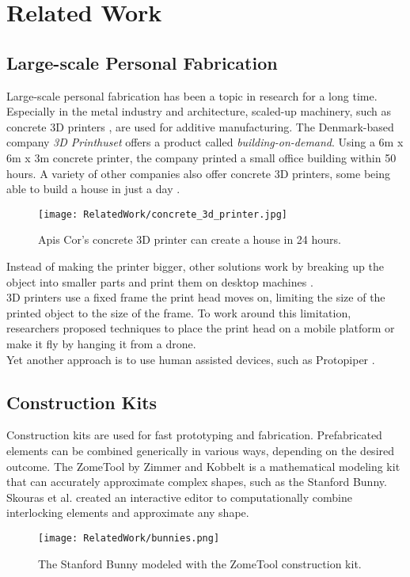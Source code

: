 \chapter{Related Work}\label{ch:relatedwork}
\section{Large-scale Personal Fabrication}
Large-scale personal fabrication has been a topic in research for a long time. Especially in the metal industry and architecture, scaled-up machinery, such as concrete 3D printers \cite{epstein:2003}, are used for additive manufacturing. The Denmark-based company \textit{3D Printhuset}\cite{printhuset} offers a product called \textit{building-on-demand}. Using a 6m x 6m x 3m concrete printer, the company printed a small office building within 50 hours. A variety of other companies also offer concrete 3D printers, some being able to build a house in just a day \cite{apiscor}.\\
\begin{figure}[h!]
    \texttt{[image: RelatedWork/concrete\_3d\_printer.jpg]}
    \centering
    \caption{Apis Cor’s concrete 3D printer can create a house in 24 hours.}
    \label{fig:concrete_3d_printer}
\end{figure}
Instead of making the printer bigger, other solutions work by breaking up the object into smaller parts and print them on desktop machines \cite{lau:2011, luo:2012}.\\
3D printers use a fixed frame the print head moves on, limiting the size of the printed object to the size of the frame. To work around this limitation, researchers proposed techniques to place the print head on a mobile platform \cite{jokic:2016} or make it fly \cite{willmann:2012} by hanging it from a drone.\\
Yet another approach is to use human assisted devices, such as Protopiper \cite{agrawal:2015}.

\section{Construction Kits}
Construction kits are used for fast prototyping and fabrication. Prefabricated elements can be combined generically in various ways, depending on the desired outcome. The ZomeTool by Zimmer and Kobbelt \cite{zimmer:2014} is a mathematical modeling kit that can accurately approximate complex shapes, such as the Stanford Bunny. Skouras et al. \cite{skouras:2015} created an interactive editor to computationally combine interlocking elements and approximate any shape.
\begin{figure}[h!]
    \texttt{[image: RelatedWork/bunnies.png]}
    \centering
    \caption{The Stanford Bunny modeled with the ZomeTool construction kit.}
    \label{fig:bunnies}
\end{figure}


